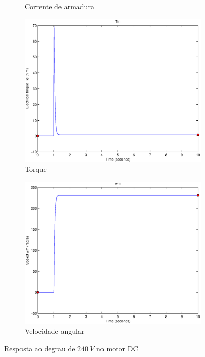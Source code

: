 \documentclass{article}
\begin{document}
\begin{figure}[H]
\begin{subfigure}{0.45\textwidth}
		\caption{Corrente de armadura}
	\end{subfigure}
	\begin{subfigure}{0.45\textwidth}
		\includegraphics[width=\linewidth]{matlab/tm1}
		\caption{Torque}
	\end{subfigure}
	\begin{subfigure}{0.45\textwidth}
		\includegraphics[width=\linewidth]{matlab/wm1}
		\caption{Velocidade angular}
	\end{subfigure}
	\caption{Resposta ao degrau de $240\ V$ no motor DC}	
	\label{fig:sim1viwt}
\end{figure}
\end{document}
